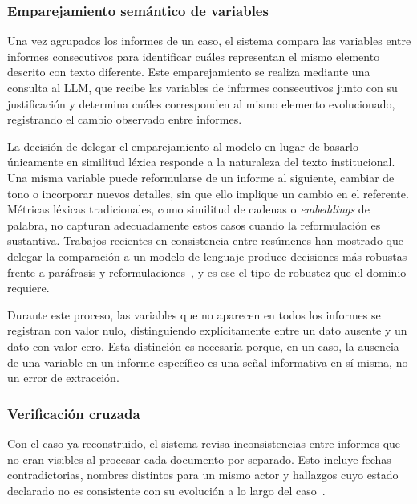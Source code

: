 \subsubsection{Emparejamiento semántico de variables}

Una vez agrupados los informes de un caso, el sistema compara 
las variables entre informes consecutivos para identificar 
cuáles representan el mismo elemento descrito con texto 
diferente. Este emparejamiento se realiza mediante una consulta 
al \acs{LLM}, que recibe las variables de informes consecutivos junto 
con su justificación y determina cuáles corresponden al mismo 
elemento evolucionado, registrando el cambio observado entre 
informes.

La decisión de delegar el emparejamiento al modelo en lugar de 
basarlo únicamente en similitud léxica responde a la naturaleza 
del texto institucional. Una misma variable puede reformularse 
de un informe al siguiente, cambiar de tono o incorporar nuevos 
detalles, sin que ello implique un cambio en el referente. 
Métricas léxicas tradicionales, como similitud de cadenas o 
\textit{embeddings} de palabra, no capturan adecuadamente estos casos 
cuando la reformulación es sustantiva. Trabajos recientes en 
consistencia entre resúmenes han mostrado que delegar la 
comparación a un modelo de lenguaje produce decisiones más 
robustas frente a paráfrasis y reformulaciones~\cite{laban2022summac}, 
y es ese el tipo de robustez que el dominio requiere.

Durante este proceso, las variables que no aparecen en todos 
los informes se registran con valor nulo, distinguiendo 
explícitamente entre un dato ausente y un dato con valor cero. 
Esta distinción es necesaria porque, en un caso, la ausencia de 
una variable en un informe específico es una señal informativa 
en sí misma, no un error de extracción.

\subsubsection{Verificación cruzada}

Con el caso ya reconstruido, el sistema revisa inconsistencias 
entre informes que no eran visibles al procesar cada documento 
por separado. Esto incluye fechas contradictorias, nombres 
distintos para un mismo actor y hallazgos cuyo estado declarado 
no es consistente con su evolución a lo largo del 
caso~\cite{manakul2023selfcheckgpt}.

